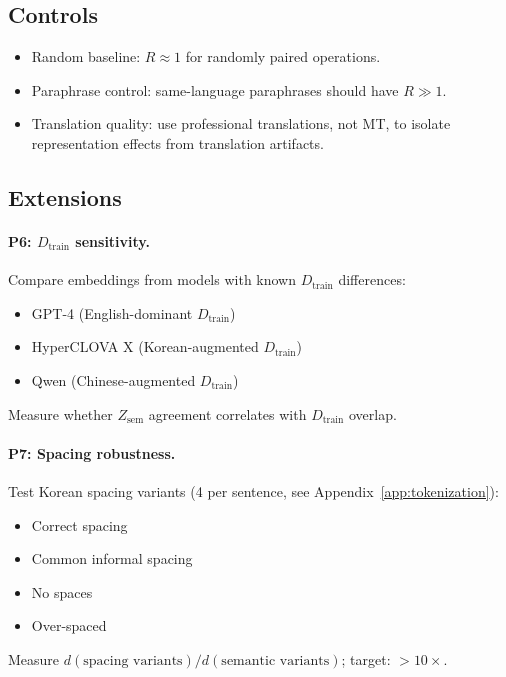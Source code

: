 \documentclass{article}
\theoremstyle{definition}
\newcommand{\Zsem}{Z_{\text{sem}}}
\newcommand{\Dtrain}{D_{\text{train}}}
\begin{document}
\subsection{Controls}

\begin{itemize}[nosep]
  \item Random baseline: $R \approx 1$ for randomly paired operations.
  \item Paraphrase control: same-language paraphrases should have $R \gg 1$.
  \item Translation quality: use professional translations, not MT, to isolate representation effects from translation artifacts.
\end{itemize}

\subsection{Extensions}

\paragraph{P6: $\Dtrain$ sensitivity.}
Compare embeddings from models with known $\Dtrain$ differences:
\begin{itemize}[nosep]
  \item GPT-4 (English-dominant $\Dtrain$)
  \item HyperCLOVA X (Korean-augmented $\Dtrain$)
  \item Qwen (Chinese-augmented $\Dtrain$)
\end{itemize}
Measure whether $\Zsem$ agreement correlates with $\Dtrain$ overlap.

\paragraph{P7: Spacing robustness.}
Test Korean spacing variants (4 per sentence, see Appendix~\ref{app:tokenization}):
\begin{itemize}[nosep]
  \item Correct spacing
  \item Common informal spacing
  \item No spaces
  \item Over-spaced
\end{itemize}
Measure $d(\text{spacing variants}) / d(\text{semantic variants})$; target: $> 10\times$.
\end{document}
